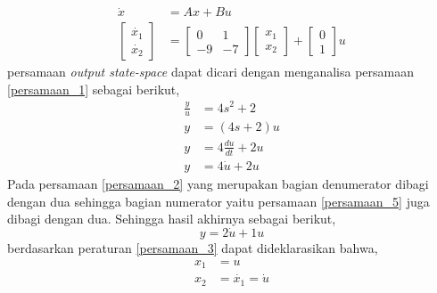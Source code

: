 \documentclass[../cover.tex]{subfiles}
\begin{document}
        \begin{equation}
            \begin{split}
                \dot{x}&=Ax+Bu \\[5pt]
                \begin{bmatrix} \dot{x_1} \\ \dot{x_2} \end{bmatrix} &= \begin{bmatrix} 0 & 1 \\ -9 & -7 \end{bmatrix} \begin{bmatrix} x_1 \\ x_2 \end{bmatrix} + \begin{bmatrix} 0 \\ 1 \end{bmatrix} u
            \label{persamaan_4}
            \end{split}
        \end{equation}
        persamaan \textit{output state-space} dapat dicari dengan menganalisa persamaan \eqref{persamaan_1} sebagai berikut,
        \begin{equation}
            \begin{split}
                \frac{y}{u} &= 4s^2 + 2 \\[5pt]
                y &= (4s+2)u \\[5pt]
                y &= 4\frac{du}{dt} + 2u \\[5pt]
                y &= 4\dot{u} + 2u
                \label{persamaan_5}
            \end{split}
        \end{equation}
        Pada persamaan \eqref{persamaan_2} yang merupakan bagian denumerator dibagi dengan dua sehingga bagian numerator yaitu persamaan \eqref{persamaan_5} juga dibagi dengan dua. Sehingga hasil akhirnya sebagai berikut,
        \begin{equation}
            y = 2\dot{u} + 1u
        \end{equation}
        berdasarkan peraturan \eqref{persamaan_3} dapat dideklarasikan bahwa,
        \begin{equation}
            \begin{split}
                x_1 &= u \\[5pt]
                x_2 &= \dot{x_1} = \dot{u}
                \label{persamaan_6}
            \end{split}
        \end{equation}
\end{document}
